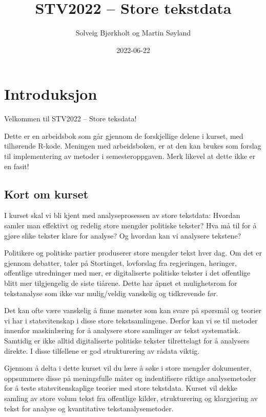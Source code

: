 \documentclass[
]{article}
\title{STV2022 -- Store tekstdata}
\author{Solveig Bjørkholt og Martin Søyland}
\date{2022-06-22}
\begin{document}
\maketitle

\hypertarget{introduksjon}{%
\section{Introduksjon}\label{introduksjon}}

Velkommen til STV2022 -- Store teksdata!

Dette er en arbeidsbok som går gjennom de forskjellige delene i kurset,
med tilhørende R-kode. Meningen med arbeidsboken, er at den kan brukes
som forslag til implementering av metoder i semesteroppgaven. Merk
likevel at dette ikke er en fasit!

\hypertarget{kort-om-kurset}{%
\subsection{Kort om kurset}\label{kort-om-kurset}}

I kurset skal vi bli kjent med analyseprosessen av store tekstdata:
Hvordan samler man effektivt og redelig store mengder politiske tekster?
Hva må til for å gjøre slike tekster klare for analyse? Og hvordan kan
vi analysere tekstene?

Politikere og politiske partier produserer store mengder tekst hver dag.
Om det er gjennom debatter, taler på Stortinget, lovforslag fra
regjeringen, høringer, offentlige utredninger med mer, er digitaliserte
politiske tekster i det offentlige blitt mer tilgjengelig de siste
tiårene. Dette har åpnet et mulighetsrom for tekstanalyse som ikke var
mulig/veldig vanskelig og tidkrevende før.

Det kan ofte være vanskelig å finne mønster som kan svare på spørsmål og
teorier vi har i statsvitenskap i disse store tekstsamlingene. Derfor
kan vi se til metoder innenfor maskinlæring for å analysere store
samlinger av tekst systematisk. Samtidig er ikke alltid digitaliserte
politiske tekster tilrettelagt for å analysers direkte. I disse
tilfellene er god strukturering av rådata viktig.

Gjennom å delta i dette kurset vil du lære å søke i store mengder
dokumenter, oppsummere disse på meningsfulle måter og indentifisere
riktige analysemetoder for å teste statsvitenskaplige teorier med store
tekstdata. Kurset vil dekke samling av store volum tekst fra offentlige
kilder, strukturering og klargjøring av tekst for analyse og
kvantitative tekstanalysemetoder.
\end{document}
